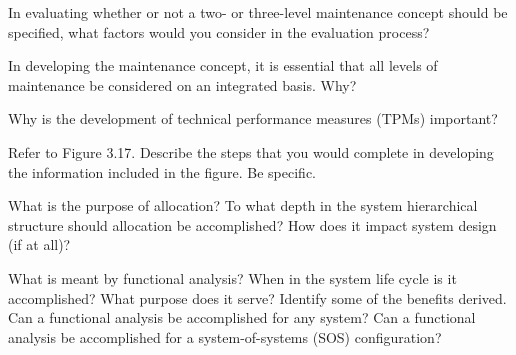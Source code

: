 \begin{exercises}
    \begin{exercise}
    \label{sea-03-13}
        In evaluating whether or not a two- or three-level maintenance concept should be specified, what factors would you consider in the evaluation process?
    \end{exercise}
    \begin{solution}
    \end{solution}
    
    \begin{exercise}
    \label{sea-03-14}
        In developing the maintenance concept, it is essential that all levels of maintenance be considered on an integrated basis. Why?
    \end{exercise}
    \begin{solution}
    \end{solution}
    
    \begin{exercise}
    \label{sea-03-15}
        Why is the development of technical performance measures (TPMs) important?
    \end{exercise}
    \begin{solution}
    \end{solution}
    
    \begin{exercise}
    \label{sea-03-16}
        Refer to Figure 3.17. Describe the steps that you would complete in developing the information included in the figure. Be specific.
    \end{exercise}
    \begin{solution}
    \end{solution}
    
    \begin{exercise}
    \label{sea-03-17}
        What is the purpose of allocation? To what depth in the system hierarchical structure should allocation be accomplished? How does it impact system design (if at all)?
    \end{exercise}
    \begin{solution}
    \end{solution}
    
    \begin{exercise}
    \label{sea-03-18}
        What is meant by functional analysis? When in the system life cycle is it accomplished? What purpose does it serve? Identify some of the benefits derived. Can a functional analysis be accomplished for any system? Can a functional analysis be accomplished for a system-of-systems (SOS) configuration?
    \end{exercise}
    \begin{solution}
    \end{solution}
    

\end{exercises}
